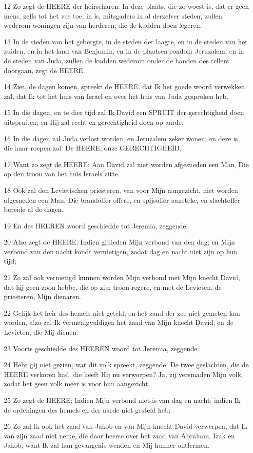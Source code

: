 \par 12 Zo zegt de HEERE der heirscharen: In deze plaats, die zo woest is, dat er geen mens, zelfs tot het vee toe, in is, mitsgaders in al derzelver steden, zullen wederom woningen zijn van herderen, die de kudden doen legeren.
\par 13 In de steden van het gebergte, in de steden der laagte, en in de steden van het zuiden, en in het land van Benjamin, en in de plaatsen rondom Jeruzalem, en in de steden van Juda, zullen de kudden wederom onder de handen des tellers doorgaan, zegt de HEERE.
\par 14 Ziet, de dagen komen, spreekt de HEERE, dat Ik het goede woord verwekken zal, dat Ik tot het huis van Israel en over het huis van Juda gesproken heb.
\par 15 In die dagen, en te dier tijd zal Ik David een SPRUIT der gerechtigheid doen uitspruiten; en Hij zal recht en gerechtigheid doen op aarde.
\par 16 In die dagen zal Juda verlost worden, en Jeruzalem zeker wonen; en deze is, die haar roepen zal: De HEERE, onze GERECHTIGHEID.
\par 17 Want zo zegt de HEERE: Aan David zal niet worden afgesneden een Man, Die op den troon van het huis Israels zitte.
\par 18 Ook zal den Levietischen priesteren, van voor Mijn aangezicht, niet worden afgesneden een Man, Die brandoffer offere, en spijsoffer aansteke, en slachtoffer bereide al de dagen.
\par 19 En des HEEREN woord geschiedde tot Jeremia, zeggende:
\par 20 Alzo zegt de HEERE: Indien gijlieden Mijn verbond van den dag; en Mijn verbond van den nacht kondt vernietigen, zodat dag en nacht niet zijn op hun tijd;
\par 21 Zo zal ook vernietigd kunnen worden Mijn verbond met Mijn knecht David, dat hij geen zoon hebbe, die op zijn troon regere, en met de Levieten, de priesteren, Mijn dienaren.
\par 22 Gelijk het heir des hemels niet geteld, en het zand der zee niet gemeten kan worden, alzo zal Ik vermenigvuldigen het zaad van Mijn knecht David, en de Levieten, die Mij dienen.
\par 23 Voorts geschiedde des HEEREN woord tot Jeremia, zeggende:
\par 24 Hebt gij niet gezien, wat dit volk spreekt, zeggende: De twee geslachten, die de HEERE verkoren had, die heeft Hij nu verworpen? Ja, zij versmaden Mijn volk, zodat het geen volk meer is voor hun aangezicht.
\par 25 Zo zegt de HEERE: Indien Mijn verbond niet is van dag en nacht; indien Ik de ordeningen des hemels en der aarde niet gesteld heb;
\par 26 Zo zal Ik ook het zaad van Jakob en van Mijn knecht David verwerpen, dat Ik van zijn zaad niet neme, die daar heerse over het zaad van Abraham, Izak en Jakob; want Ik zal hun gevangenis wenden en Mij hunner ontfermen.

